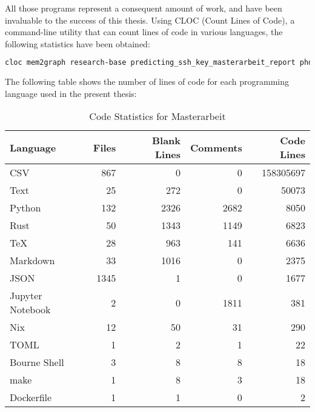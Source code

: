 All those programs represent a consequent amount of work, and have been invaluable to the success of this thesis. Using CLOC (Count Lines of Code),  a command-line utility that can count lines of code in various languages, the following statistics have been obtained:

\begin{lstlisting}[language=bash, caption={Command used to count the number of lines of code in the \textit{phdtrack} directory, containing the reposiroties of the present thesis.}]
    cloc mem2graph research-base predicting_ssh_key_masterarbeit_report phdtrack_server_scripts phdtrack_project_3 memory_graph_gcn data_processing_masterarbeit --exclude-dir=.venv
\end{lstlisting}

The following table shows the number of lines of code for each programming language used in the present thesis:

\begin{table}[h]
    \centering
    \caption{Code Statistics for Masterarbeit}
    \label{tab:cloc_output}
    \begin{tabular}{|l|r|r|r|r|}
        \hline
        Language & Files & Blank Lines & Comments & Code Lines \\
        \hline
        CSV & 867 & 0 & 0 & 158305697 \\
        Text & 25 & 272 & 0 & 50073 \\
        Python & 132 & 2326 & 2682 & 8050 \\
        Rust & 50 & 1343 & 1149 & 6823 \\
        TeX & 28 & 963 & 141 & 6636 \\
        Markdown & 33 & 1016 & 0 & 2375 \\
        JSON & 1345 & 1 & 0 & 1677 \\
        Jupyter Notebook & 2 & 0 & 1811 & 381 \\
        Nix & 12 & 50 & 31 & 290 \\
        TOML & 1 & 2 & 1 & 22 \\
        Bourne Shell & 3 & 8 & 8 & 18 \\
        make & 1 & 8 & 3 & 18 \\
        Dockerfile & 1 & 1 & 0 & 2 \\
        \hline
    \end{tabular}
\end{table}

